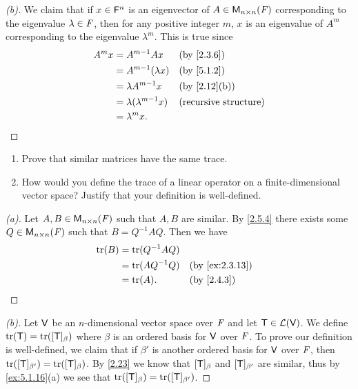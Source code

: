 \begin{proof}[(b)]
	We claim that if \(x \in \mathsf{F}^n\) is an eigenvector of \(A \in \ms[n][n][\F]\) corresponding to the eigenvalue \(\lambda \in \mathit{F}\), then for any positive integer \(m\), \(x\) is an eigenvalue of \(A^m\) corresponding to the eigenvalue \(\lambda^m\).
	This is true since
	\begin{align*}
		A^m x & = A^{m - 1} Ax                &  & \by{2.3.6}                   \\
		      & = A^{m - 1}(\lambda x)        &  & \by{5.1.2}                   \\
		      & = \lambda A^{m - 1} x         &  & \by{2.12}[b]                 \\
		      & = \lambda (\lambda^{m - 1} x) &  & \text{(recursive structure)} \\
		      & = \lambda^m x.
	\end{align*}
\end{proof}

\begin{ex}\label{ex:5.1.16}
	\begin{enumerate}
		\item Prove that similar matrices have the same trace.
		\item How would you define the trace of a linear operator on a finite-dimensional vector space?
		      Justify that your definition is well-defined.
	\end{enumerate}
\end{ex}

\begin{proof}[(a)]
	Let \(A, B \in \ms[n][n][\F]\) such that \(A, B\) are similar.
	By \cref{2.5.4} there exists some \(Q \in \ms[n][n][\F]\) such that \(B = Q^{-1} A Q\).
	Then we have
	\begin{align*}
		\tr(B) & = \tr(Q^{-1} A Q)                     \\
		       & = \tr(A Q^{-1} Q) &  & \by{ex:2.3.13} \\
		       & = \tr(A).         &  & \by{2.4.3}
	\end{align*}
\end{proof}

\begin{proof}[(b)]
	Let \(\mathsf{V}\) be an \(n\)-dimensional vector space over \(\mathit{F}\) and let \(\mathsf{T} \in \mathcal{L}(\mathsf{V})\).
	We define \(\tr(\T) = \tr([\T]_{\beta})\) where \(\beta\) is an ordered basis for \(\mathsf{V}\) over \(\mathit{F}\).
	To prove our definition is well-defined, we claim that if \(\beta'\) is another ordered basis for \(\mathsf{V}\) over \(\mathit{F}\), then \(\tr([\T]_{\beta'}) = \tr([\T]_{\beta})\).
	By \cref{2.23} we know that \([\mathsf{T}]_{\beta}\) and \([\mathsf{T}]_{\beta'}\) are similar, thus by \cref{ex:5.1.16}(a) we see that \(\tr([\T]_{\beta}) = \tr([\T]_{\beta'})\).
\end{proof}

